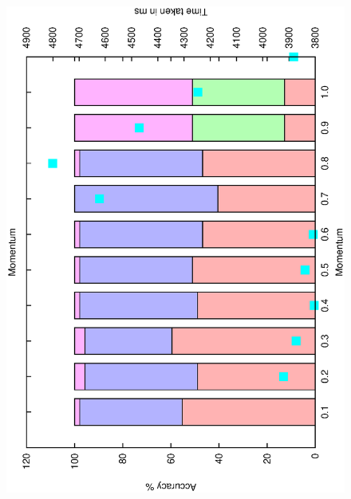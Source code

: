\documentclass[12pt,a4,notitlepage]{report}
\renewcommand{\_}{\texttt{\symbol{95}}}
\newcommand{\<}{\texttt{\symbol{60}}}
\renewcommand{\>}{\texttt{\symbol{62}}}
\begin{document}
\begin{figure}
\includegraphics[scale=0.3,angle=-90]{results/neural/n_momentum.ps}

\end{figure}
\end{document}
